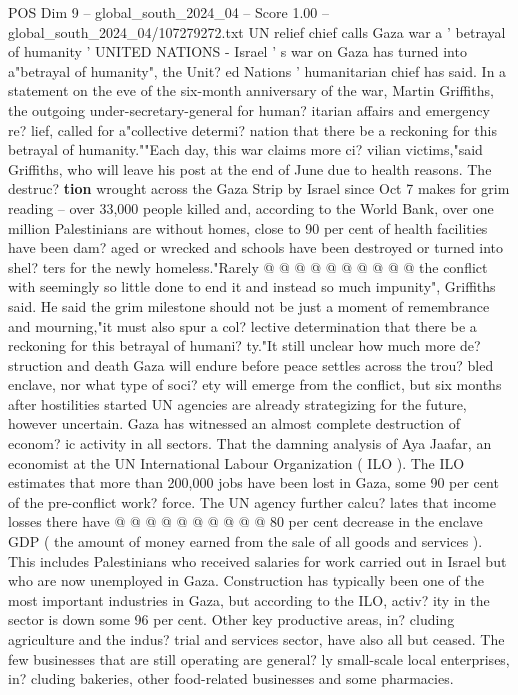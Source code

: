 \begin{textsample}{POS Dim 9 – global\_south\_2024\_04 – Score 1.00 – global\_south\_2024\_04/107279272.txt}  \label{ex:f9_pos_077}
UN relief chief calls Gaza war a ' betrayal of humanity ' UNITED NATIONS - Israel ' s war on Gaza has turned into a"betrayal of humanity", the Unit? ed Nations ' humanitarian chief has said.
In a statement on the eve of the six-month anniversary of the war, Martin Griffiths, the outgoing under-secretary-general for human? itarian affairs and emergency re? lief, called for a"collective determi? nation that there be a reckoning for this betrayal of humanity.""Each day, this war claims more ci? vilian victims,"said Griffiths, who will leave his post at the end of June due to health reasons.
The destruc? \textbf{tion} wrought across the Gaza Strip by Israel since Oct 7 makes for grim reading -- over 33,000 people killed and, according to the World Bank, over one million Palestinians are without homes, close to 90 per cent of health facilities have been dam? aged or wrecked and schools have been destroyed or turned into shel? ters for the newly homeless."Rarely @ @ @ @ @ @ @ @ @ @ the conflict with seemingly so little done to end it and instead so much impunity", Griffiths said.
He said the grim milestone should not be just a moment of remembrance and mourning,"it must also spur a col? lective determination that there be a reckoning for this betrayal of humani? ty."It still unclear how much more de? struction and death Gaza will endure before peace settles across the trou? bled enclave, nor what type of soci? ety will emerge from the conflict, but six months after hostilities started UN agencies are already strategizing for the future, however uncertain.
Gaza has witnessed an almost complete destruction of econom? ic activity in all sectors.
That the damning analysis of Aya Jaafar, an economist at the UN International Labour Organization ( ILO ).
The ILO estimates that more than 200,000 jobs have been lost in Gaza, some 90 per cent of the pre-conflict work? force.
The UN agency further calcu? lates that income losses there have @ @ @ @ @ @ @ @ @ @ 80 per cent decrease in the enclave GDP ( the amount of money earned from the sale of all goods and services ).
This includes Palestinians who received salaries for work carried out in Israel but who are now unemployed in Gaza.
Construction has typically been one of the most important industries in Gaza, but according to the ILO, activ? ity in the sector is down some 96 per cent.
Other key productive areas, in? cluding agriculture and the indus? trial and services sector, have also all but ceased.
The few businesses that are still operating are general? ly small-scale local enterprises, in? cluding bakeries, other food-related businesses and some pharmacies.

\end{textsample}
